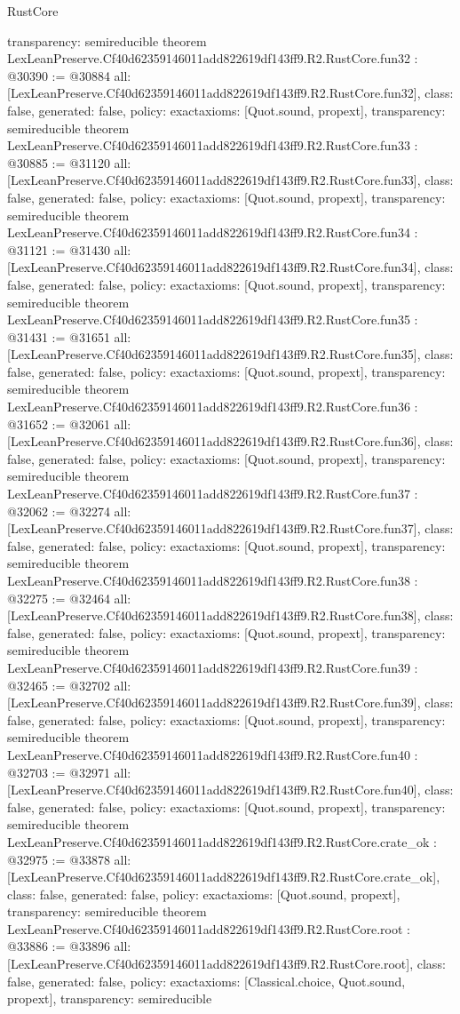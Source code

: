 \begin{lexlean}{RustCore}
\begin{coremodule}
{  transparency: semireducible
}
theorem LexLeanPreserve.Cf40d62359146011add822619df143ff9.R2.RustCore.fun32 : @30390 := @30884 {
  all: [LexLeanPreserve.Cf40d62359146011add822619df143ff9.R2.RustCore.fun32],
  class: false,
  generated: false,
  policy: exact{axioms: [Quot.sound, propext]},
  transparency: semireducible
}
theorem LexLeanPreserve.Cf40d62359146011add822619df143ff9.R2.RustCore.fun33 : @30885 := @31120 {
  all: [LexLeanPreserve.Cf40d62359146011add822619df143ff9.R2.RustCore.fun33],
  class: false,
  generated: false,
  policy: exact{axioms: [Quot.sound, propext]},
  transparency: semireducible
}
theorem LexLeanPreserve.Cf40d62359146011add822619df143ff9.R2.RustCore.fun34 : @31121 := @31430 {
  all: [LexLeanPreserve.Cf40d62359146011add822619df143ff9.R2.RustCore.fun34],
  class: false,
  generated: false,
  policy: exact{axioms: [Quot.sound, propext]},
  transparency: semireducible
}
theorem LexLeanPreserve.Cf40d62359146011add822619df143ff9.R2.RustCore.fun35 : @31431 := @31651 {
  all: [LexLeanPreserve.Cf40d62359146011add822619df143ff9.R2.RustCore.fun35],
  class: false,
  generated: false,
  policy: exact{axioms: [Quot.sound, propext]},
  transparency: semireducible
}
theorem LexLeanPreserve.Cf40d62359146011add822619df143ff9.R2.RustCore.fun36 : @31652 := @32061 {
  all: [LexLeanPreserve.Cf40d62359146011add822619df143ff9.R2.RustCore.fun36],
  class: false,
  generated: false,
  policy: exact{axioms: [Quot.sound, propext]},
  transparency: semireducible
}
theorem LexLeanPreserve.Cf40d62359146011add822619df143ff9.R2.RustCore.fun37 : @32062 := @32274 {
  all: [LexLeanPreserve.Cf40d62359146011add822619df143ff9.R2.RustCore.fun37],
  class: false,
  generated: false,
  policy: exact{axioms: [Quot.sound, propext]},
  transparency: semireducible
}
theorem LexLeanPreserve.Cf40d62359146011add822619df143ff9.R2.RustCore.fun38 : @32275 := @32464 {
  all: [LexLeanPreserve.Cf40d62359146011add822619df143ff9.R2.RustCore.fun38],
  class: false,
  generated: false,
  policy: exact{axioms: [Quot.sound, propext]},
  transparency: semireducible
}
theorem LexLeanPreserve.Cf40d62359146011add822619df143ff9.R2.RustCore.fun39 : @32465 := @32702 {
  all: [LexLeanPreserve.Cf40d62359146011add822619df143ff9.R2.RustCore.fun39],
  class: false,
  generated: false,
  policy: exact{axioms: [Quot.sound, propext]},
  transparency: semireducible
}
theorem LexLeanPreserve.Cf40d62359146011add822619df143ff9.R2.RustCore.fun40 : @32703 := @32971 {
  all: [LexLeanPreserve.Cf40d62359146011add822619df143ff9.R2.RustCore.fun40],
  class: false,
  generated: false,
  policy: exact{axioms: [Quot.sound, propext]},
  transparency: semireducible
}
theorem LexLeanPreserve.Cf40d62359146011add822619df143ff9.R2.RustCore.crate_ok : @32975 := @33878 {
  all: [LexLeanPreserve.Cf40d62359146011add822619df143ff9.R2.RustCore.crate_ok],
  class: false,
  generated: false,
  policy: exact{axioms: [Quot.sound, propext]},
  transparency: semireducible
}
theorem LexLeanPreserve.Cf40d62359146011add822619df143ff9.R2.RustCore.root : @33886 := @33896 {
  all: [LexLeanPreserve.Cf40d62359146011add822619df143ff9.R2.RustCore.root],
  class: false,
  generated: false,
  policy: exact{axioms: [Classical.choice, Quot.sound, propext]},
  transparency: semireducible
}


\end{coremodule}
\end{lexlean}
